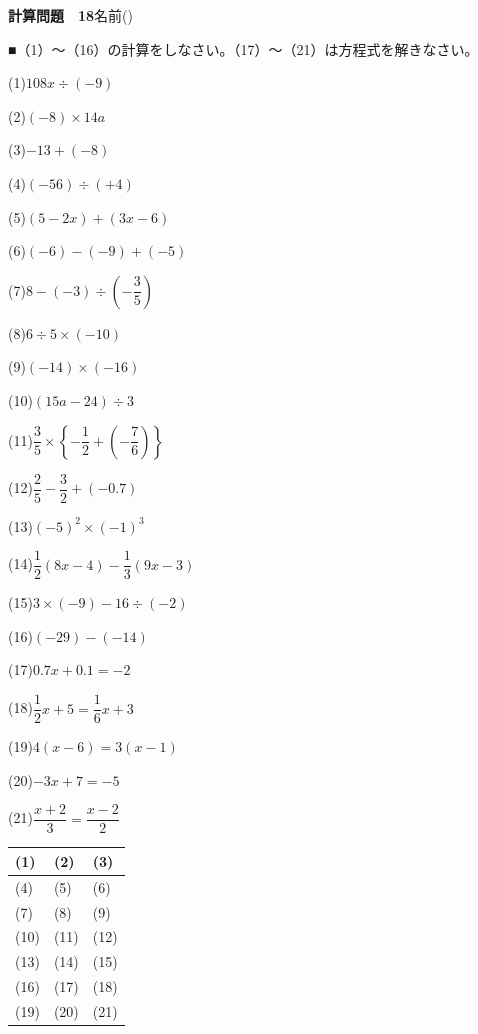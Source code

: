 \documentclass[a4paper,11pt]{ltjsarticle}
\newlength{\qcol}\setlength{\qcol}{0.47\textwidth}
\newlength{\qgap}
\newlength{\anscolw}\setlength{\anscolw}{0.30\textwidth}
\newlength{\ansh}
\newcommand{\Q}[2]{\parbox[t]{\qcol}{\raggedright (#1)\hspace{0.6em}$\displaystyle #2$}}
\newcommand{\QR}[4]{\Q{#1}{#2}\hfill\Q{#3}{#4}\par\vspace{\qgap}}
\newcommand{\anscell}[1]{\rule[-\ansdrop]{0pt}{\ansh}(#1)}
\newlength{\ansdrop}
\begin{document}
{\large\bfseries 計算問題　18}\hfill 名前(\underline{\hspace{32mm}})\par\vspace{3mm}
■（1）〜（16）の計算をしなさい。（17）〜（21）は方程式を解きなさい。\par\vspace{3mm}
\setlength{\qgap}{5.4mm}
\QR{1}{108x\div(-9)}{2}{(-8)\times14a}
\QR{3}{-13+(-8)}{4}{(-56)\div(+4)}
\QR{5}{(5-2x)+(3x-6)}{6}{(-6)-(-9)+(-5)}
\QR{7}{8-(-3)\div\left(-\dfrac{3}{5}\right)}{8}{6\div5\times(-10)}
\QR{9}{(-14)\times(-16)}{10}{(15a-24)\div3}
\QR{11}{\dfrac{3}{5}\times\left\{-\dfrac{1}{2}+\left(-\dfrac{7}{6}\right)\right\}}{12}{\dfrac{2}{5}-\dfrac{3}{2}+(-0.7)}
\QR{13}{(-5)^2\times(-1)^3}{14}{\dfrac{1}{2}(8x-4)-\dfrac{1}{3}(9x-3)}
\QR{15}{3\times(-9)-16\div(-2)}{16}{(-29)-(-14)}
\QR{17}{0.7x+0.1=-2}{18}{\dfrac{1}{2}x+5=\dfrac{1}{6}x+3}
\QR{19}{4(x-6)=3(x-1)}{20}{-3x+7=-5}
\vspace{1mm}
\Q{21}{\dfrac{x+2}{3}=\dfrac{x-2}{2}}\par\vspace{3mm}
\setlength{\ansh}{9.5mm}\setlength{\ansdrop}{6mm}%
\begin{center}\begin{tabular}{|p{\anscolw}|p{\anscolw}|p{\anscolw}|}\hline
\anscell{1} & \anscell{2} & \anscell{3} \\\hline
\anscell{4} & \anscell{5} & \anscell{6} \\\hline
\anscell{7} & \anscell{8} & \anscell{9} \\\hline
\anscell{10} & \anscell{11} & \anscell{12} \\\hline
\anscell{13} & \anscell{14} & \anscell{15} \\\hline
\anscell{16} & \anscell{17} & \anscell{18} \\\hline
\anscell{19} & \anscell{20} & \anscell{21} \\\hline
\end{tabular}\end{center}
\end{document}
